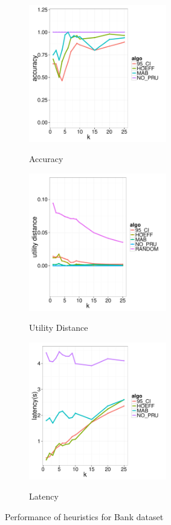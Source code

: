\begin{figure}[t]
	\centering
	\begin{subfigure}{0.33\linewidth}
		\centering
		{\includegraphics[width=6cm] {Images/in_memory_bank_accuracy.pdf}}
		\caption{Accuracy}
		\label{fig:bank_accuracy}
	\end{subfigure}
	\begin{subfigure}{0.33\linewidth}
		\centering
		{\includegraphics[width=6cm] {Images/in_memory_bank_utility_dist.pdf}}
		\caption{Utility Distance}
		\label{fig:bank_utility_dist}
	\end{subfigure}
	\begin{subfigure}{0.33\linewidth}
		\centering
		{\includegraphics[width=6cm] {Images/in_memory_bank_latency.pdf}}
		\caption{Latency}
		\label{fig:bank_latency}
	\end{subfigure}
	\caption{Performance of heuristics for Bank dataset}
	\label{fig:bank_perf}
\end{figure}

